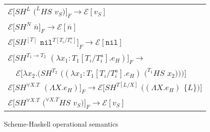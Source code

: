 \begin{figure}[p]
\centering
\begin{tabular}{l}
\vspace{5pt}

$\mathscr{E}[SH^{L}$ $(^{L}HS$ $v_{S})]_{F}\rightarrow\mathscr{E}[v_{S}]$ \\

\vspace{5pt}

$\mathscr{E}[SH^{N}$ $\overline{n}]_{F}\rightarrow\mathscr{E}[\overline{n}]$ \\

\vspace{5pt}

$\mathscr{E}[SH^{[T]}$ $\mathtt{nil}^{T[T_{i}/T_{i}^{a}]}]_{F}\rightarrow\mathscr{E}[\mathtt{nil}]$ \\

\vspace{5pt}

$\mathscr{E}[SH^{T_{1}\rightarrow T_{2}}$ $(\lambda x_{1}:T_{1}[T_{i}/T_{i}^{a}].e_{H})]_{F}\rightarrow$ \\

\vspace{5pt}

$\quad\mathscr{E}[\lambda x_{2}.(SH^{T_{2}}$ $((\lambda x_{1}:T_{1}[T_{i}/T_{i}^{a}].e_{H})$ $(^{T_{1}}HS$ $x_{2})))]$ \\

\vspace{5pt}

$\mathscr{E}[SH^{\forall X.T}$ $(\Lambda X.e_{H})]_{F}\rightarrow\mathscr{E}[SH^{T[L/X]}$ $((\Lambda X.e_{H})$ $\lbrace L\rbrace)]$ \\

\vspace{5pt}

$\mathscr{E}[SH^{\forall X.T}$ $(^{\forall X.T}HS$ $v_{S})]_{F}\rightarrow\mathscr{E}[v_{S}]$ \\
\end{tabular}
\caption{Scheme-Haskell operational semantics}
\label{isos}
\end{figure}